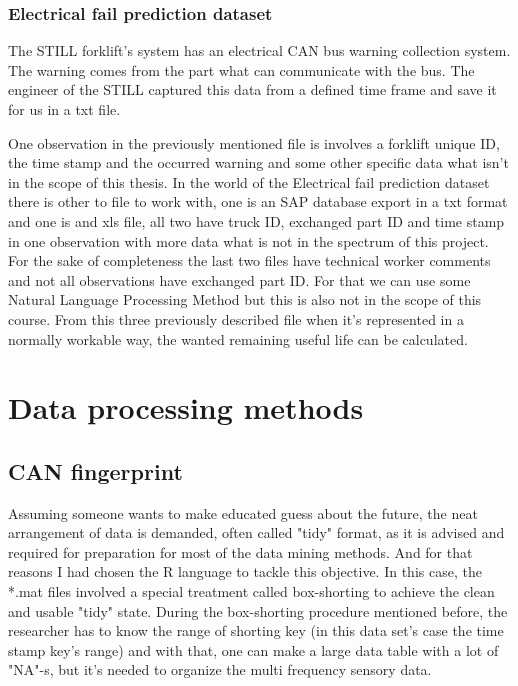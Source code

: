 			\subsubsection{Electrical fail prediction dataset}
\noindent
The STILL forklift's system has an electrical CAN bus warning collection system. The warning comes from the part what can communicate with the bus. The engineer of the STILL captured this data from a defined time frame and save it for us in a txt file. 

\noindent
One observation in the previously mentioned file is involves a forklift unique ID, the time stamp and the occurred warning and some other specific data what isn't in the scope of this thesis.
\noindent
In the world of the Electrical fail prediction dataset there is other to file to work with, one is an SAP database export in a txt format and one is and xls file, all two have truck ID, exchanged part ID and time stamp in one observation with more data what is not in the spectrum of this project.
\noindent
For the sake of completeness the last two files have technical worker comments and not all observations have exchanged part ID. For that we can use some Natural Language Processing Method but this is also not in the scope of this course.
\noindent
From this three previously described file when it's represented in a normally workable way, the wanted remaining useful life can be calculated.
	\section{Data processing methods}
		\subsection{CAN fingerprint}
				\noindent
Assuming someone wants to make educated guess about the future, the neat arrangement of data is demanded, often called "tidy" format, as it is advised and required for preparation for most of the data mining methods. And for that reasons I had chosen the R language to tackle this objective.
				\noindent
In this case, the *.mat files involved a special treatment called box-shorting to achieve the clean and usable "tidy" state. During the box-shorting procedure mentioned before, the researcher has to know the range of shorting key (in this data set's case the time stamp key's range) and with that, one can make a large data table with a lot of "NA"-s, but it's needed to organize the multi frequency sensory data.

